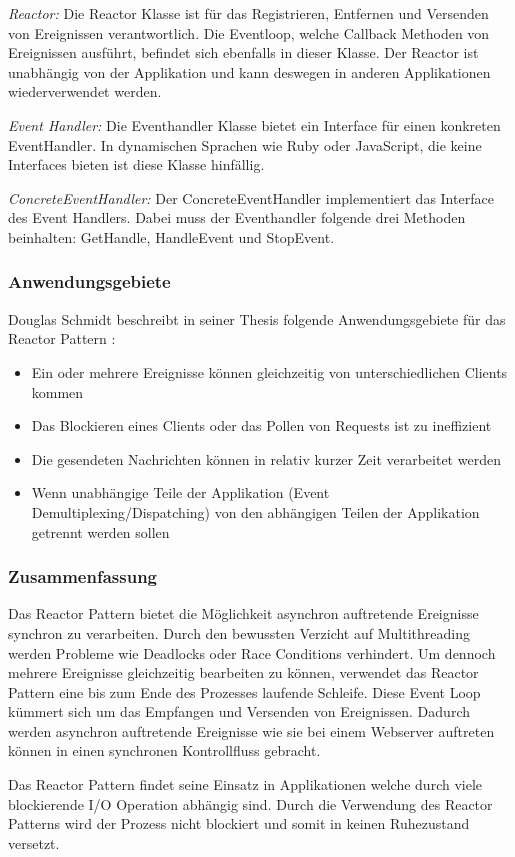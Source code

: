 \cite[p. 2]{Sch95}

\emph{Reactor:}
 Die Reactor Klasse ist für das Registrieren, Entfernen und Versenden von Ereignissen verantwortlich. Die Eventloop, welche Callback Methoden von Ereignissen ausführt, befindet sich ebenfalls in dieser Klasse. Der Reactor ist unabhängig von der Applikation und kann deswegen in anderen Applikationen wiederverwendet werden. 

\emph{Event Handler:}
Die Eventhandler Klasse bietet ein Interface für einen konkreten EventHandler. In dynamischen Sprachen wie Ruby oder JavaScript, die keine Interfaces bieten ist diese Klasse hinfällig. 

\emph{ConcreteEventHandler:}
Der ConcreteEventHandler implementiert das Interface des Event Handlers. Dabei muss der Eventhandler folgende drei Methoden beinhalten: GetHandle, HandleEvent und StopEvent.

\subsubsection{Anwendungsgebiete}

Douglas Schmidt beschreibt in seiner Thesis folgende Anwendungsgebiete für das Reactor Pattern \cite[p. 4]{Sch95}:

\begin{itemize}
  \item Ein oder mehrere Ereignisse können gleichzeitig von unterschiedlichen Clients kommen
  \item Das Blockieren eines Clients oder das Pollen von Requests ist zu ineffizient
  \item Die gesendeten Nachrichten können in relativ kurzer Zeit verarbeitet werden
  \item Wenn unabhängige Teile der Applikation (Event Demultiplexing/Dispatching) von den abhängigen Teilen der Applikation getrennt werden sollen
\end{itemize}

\subsubsection{Zusammenfassung}

Das Reactor Pattern bietet die Möglichkeit asynchron auftretende Ereignisse synchron zu verarbeiten. Durch den bewussten Verzicht auf Multithreading werden Probleme wie Deadlocks oder Race Conditions verhindert. Um dennoch mehrere Ereignisse gleichzeitig bearbeiten zu können, verwendet das Reactor Pattern eine bis zum Ende des Prozesses laufende Schleife. Diese Event Loop kümmert sich um das Empfangen und Versenden von Ereignissen. Dadurch werden asynchron auftretende Ereignisse wie sie bei einem Webserver auftreten können in einen synchronen Kontrollfluss gebracht. 

Das Reactor Pattern findet seine Einsatz in Applikationen welche durch viele blockierende I/O Operation abhängig sind. Durch die Verwendung des Reactor Patterns wird der Prozess nicht blockiert und somit in keinen Ruhezustand versetzt.